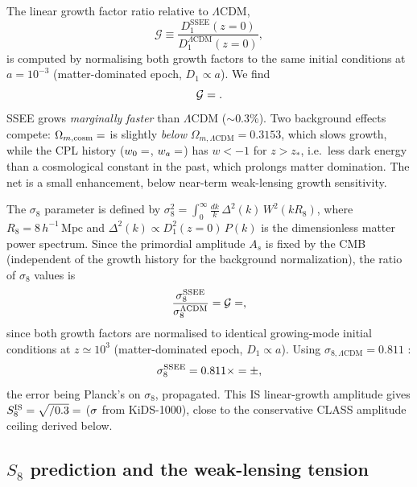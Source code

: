 \documentclass[12pt,a4paper]{article}
\newcommand{\Mpc}{\,\mathrm{Mpc}}
\begin{document}
The linear growth factor ratio relative to $\Lambda$CDM,
\begin{equation}
  \mathcal{G} \equiv \frac{D_1^{\mathrm{SSEE}}(z=0)}{D_1^{\Lambda\mathrm{CDM}}(z=0)},
  \label{eq:G_factor}
\end{equation}
is computed by normalising both growth factors to the same initial conditions
at $a=10^{-3}$ (matter-dominated epoch, $D_1 \propto a$).
We find
\begin{equation}
  \mathcal{G} = \val{p5_G}.
  \label{eq:G_value}
\end{equation}
SSEE grows \emph{marginally faster} than $\Lambda$CDM ($\sim$0.3\%).
Two background effects compete: $\Omega_{m,\mathrm{cosm}}=\val{OMEGA_M_TOTAL_d6}$ is slightly
\emph{below} $\Omega_{m,\Lambda\mathrm{CDM}}=0.3153$, which slows growth, while the CPL
history ($w_0=\val{W0_d6}$, $w_a=\val{WA_d6}$) has $w<-1$ for $z>z_*$, i.e.\ less dark
energy than a cosmological constant in the past, which prolongs matter domination.
The net is a small enhancement, below near-term weak-lensing growth sensitivity.

The $\sigma_8$ parameter is defined by
$\sigma_8^2 = \int_0^\infty \frac{dk}{k}\,\Delta^2(k)\,W^2(kR_8)$,
where $R_8 = 8\,h^{-1}\Mpc$ and $\Delta^2(k) \propto D_1^2(z=0)\,P(k)$ is the
dimensionless matter power spectrum.
Since the primordial amplitude $A_s$ is fixed by the CMB (independent of the
growth history for the background normalization), the ratio of $\sigma_8$ values is
\begin{equation}
  \frac{\sigma_8^{\mathrm{SSEE}}}{\sigma_8^{\Lambda\mathrm{CDM}}}
  = \mathcal{G} = \val{p5_G},
  \label{eq:sigma8_ratio}
\end{equation}
since both growth factors are normalised to identical growing-mode initial
conditions at $z \simeq 10^3$ (matter-dominated epoch, $D_1 \propto a$).
Using $\sigma_{8,\Lambda\mathrm{CDM}} = 0.811$ \citep{Planck2018}:
\begin{equation}
  \sigma_8^{\mathrm{SSEE}} = 0.811 \times \val{p5_G} = \val{p3_sigma8_IS} \pm \val{p5_sigma8_IS_sigma},
  \label{eq:sigma8_SSEE}
\end{equation}
the error being Planck's on $\sigma_8$, propagated. This IS linear-growth amplitude gives $S_8^{\mathrm{IS}} = \val{p3_sigma8_IS}\sqrt{\val{OMEGA_M_TOTAL_d6}/0.3}
= \val{p3_S8_IS}$ ($\val{p5_tS8_ssee_kids}\sigma$ from KiDS-1000), close to the conservative CLASS amplitude
ceiling derived below.

\subsection{$S_8$ prediction and the weak-lensing tension}
\label{subsec:S8}
\end{document}
